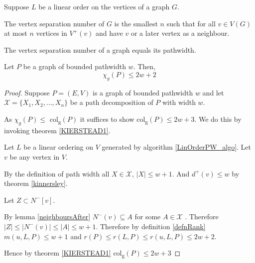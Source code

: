 \begin{definition}
    Suppose $L$ be a linear order on the vertices of a graph $G$. 
    
    The vertex separation number of $G$ is the smallest $n$ such that for all $v\in V(G)$ at most $n$ vertices in $V^+(v)$ and have $v$ or a later vertex as a neighbour.
\end{definition}

\begin{theorem}\label{kinnersley}
    The vertex separation number of a graph equals its pathwidth.
\end{theorem}

\begin{theorem}
    Let $P$ be a graph of bounded pathwidth $w$. Then, 
    \[\chi_g(P) \leq 2w + 2\]
    
\end{theorem}

\begin{proof}
    Suppose $P=(E,V)$ is a graph of bounded pathwidth $w$ and let $\mathcal{X} = \{X_1,X_2,\dots,X_n\}$ be a path decomposition of $P$ with width $w$.
    
    As $\chi_g(P) \leq$ col\textsubscript{g}$(P)$ it suffices to show col\textsubscript{g}$(P) \leq 2w + 3$. We do this by invoking theorem \ref{KIERSTEAD1}.
        
    Let $L$ be a linear ordering on $V$ generated by algorithm \ref*{LinOrderPW_algo}. 
    Let $v$ be any vertex in $V$. 
    
    By the definition of path width  all $X \in \mathcal{X}$, $ \left| X \right| \leq w + 1 $. And $d^+(v) \leq w$ by theorem \ref{kinnersley}.

    Let $Z\subset N^-[v]$.
    
    By lemma \ref{neighboursAfter} $N^-(v) \subseteq A$ for some $A \in \mathcal{X}$ . Therefore $\left| Z\right| \leq \left| N^-(v)\right| \leq |A| \leq w+1$. Therefore by definition \ref{defnRank} $m(u,L,P) \leq w+1$ and $r(P) \leq r(L,P) \leq r(u,L,P) \leq 2w+2$. 
    
    Hence by theorem \ref{KIERSTEAD1} col\textsubscript{g}$(P) \leq 2w + 3$
    
\end{proof}

